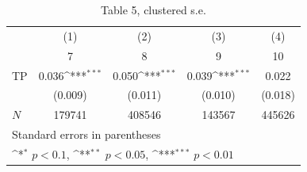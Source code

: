 \begin{table}[htbp]\centering
\def\sym#1{\ifmmode^{#1}\else\(^{#1}\)\fi}
\caption{Table 5, clustered s.e.}
\begin{tabular}{l*{4}{c}}
\hline\hline
            &\multicolumn{1}{c}{(1)}&\multicolumn{1}{c}{(2)}&\multicolumn{1}{c}{(3)}&\multicolumn{1}{c}{(4)}\\
            &\multicolumn{1}{c}{7}&\multicolumn{1}{c}{8}&\multicolumn{1}{c}{9}&\multicolumn{1}{c}{10}\\
\hline
TP          &       0.036\sym{***}&       0.050\sym{***}&       0.039\sym{***}&       0.022         \\
            &     (0.009)         &     (0.011)         &     (0.010)         &     (0.018)         \\
\hline
\(N\)       &      179741         &      408546         &      143567         &      445626         \\
\hline\hline
\multicolumn{5}{l}{\footnotesize Standard errors in parentheses}\\
\multicolumn{5}{l}{\footnotesize \sym{*} \(p<0.1\), \sym{**} \(p<0.05\), \sym{***} \(p<0.01\)}\\
\end{tabular}
\end{table}

